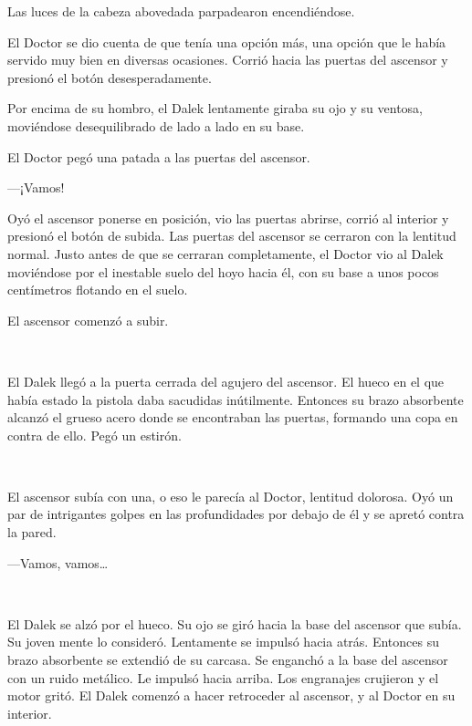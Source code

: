 Las luces de la cabeza abovedada parpadearon encendiéndose.

El Doctor se dio cuenta de que tenía una opción más, una opción que le
había servido muy bien en diversas ocasiones. Corrió hacia las puertas
del ascensor y presionó el botón desesperadamente.

Por encima de su hombro, el Dalek lentamente giraba su ojo y su ventosa,
moviéndose desequilibrado de lado a lado en su base.

El Doctor pegó una patada a las puertas del ascensor.

---¡Vamos!

Oyó el ascensor ponerse en posición, vio las puertas abrirse, corrió al
interior y presionó el botón de subida. Las puertas del ascensor se
cerraron con la lentitud normal. Justo antes de que se cerraran
completamente, el Doctor vio al Dalek moviéndose por el inestable suelo
del hoyo hacia él, con su base a unos pocos centímetros flotando en el
suelo.

El ascensor comenzó a subir.

~

El Dalek llegó a la puerta cerrada del agujero del ascensor. El hueco en
el que había estado la pistola daba sacudidas inútilmente. Entonces su
brazo absorbente alcanzó el grueso acero donde se encontraban las
puertas, formando una copa en contra de ello. Pegó un estirón.

~

El ascensor subía con una, o eso le parecía al Doctor, lentitud
dolorosa. Oyó un par de intrigantes golpes en las profundidades por
debajo de él y se apretó contra la pared.

---Vamos, vamos\ldots{}

~

El Dalek se alzó por el hueco. Su ojo se giró hacia la base del ascensor
que subía. Su joven mente lo consideró. Lentamente se impulsó hacia
atrás. Entonces su brazo absorbente se extendió de su carcasa. Se
enganchó a la base del ascensor con un ruido metálico. Le impulsó hacia
arriba. Los engranajes crujieron y el motor gritó. El Dalek comenzó a
hacer retroceder al ascensor, y al Doctor en su interior.